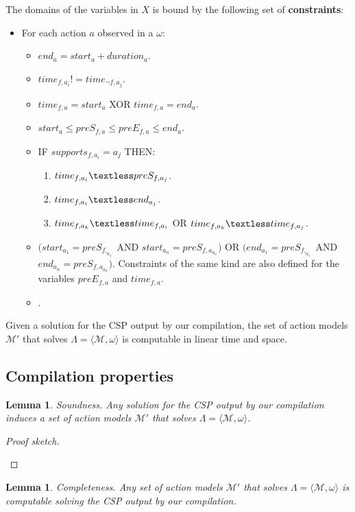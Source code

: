 \documentclass[letterpaper]{article} %
\newcommand{\tup}[1]{{\langle #1 \rangle}}
\newtheorem{lemma}[theorem]{Lemma}
\begin{document}
The domains of the variables in $X$ is bound by the following set of {\bf constraints}:
\begin{itemize}
\item For each action $a$ observed in a $\omega$:
\begin{itemize}
\item $end_a = start_a + duration_a$.
\item $time_{f,a_i}!=time_{\neg f,a_j}$.
\item $time_{f,a}= start_a$ XOR $time_{f,a}= end_a$.
\item $start_a\leq preS_{f,a}\leq preE_{f,a}\leq end_a$.
\item IF $supports_{f,a_i}=a_j$ THEN:
\begin{enumerate}
\item $time_{f,a_i}\textless  preS_{f,a_j}$.
\item $time_{f,a_i}\textless  end_{a_j}$.
\item $time_{f,a_k}\textless time_{f,a_i}$ OR $time_{f,a_k}\textless time_{f,a_j}$.
\end{enumerate}
\item $(start_{a_1} = preS_{f,_{a_1}}$ AND $start_{a_n} = preS_{f,a_{a_n}})$ OR $(end_{a_1} = preS_{f,_{a_1}}$ AND $end_{a_n} = preS_{f,a_{a_n}})$. Constraints of the same kind are also defined for the variables $preE_{f,a}$ and $time_{f,a}$.
\item .
\end{itemize}
\end{itemize}

Given a solution for the CSP output by our compilation, the set of action models $\mathcal{M}'$ that solves $\Lambda=\tup{\mathcal{M},\omega}$ is computable in linear time and space. 


\subsection{Compilation properties}
\begin{lemma}
Soundness. Any solution for the CSP output by our compilation induces a set of action models $\mathcal{M}'$ that solves $\Lambda=\tup{\mathcal{M},\omega}$.
\end{lemma}

\begin{proof}[Proof sketch]
\begin{small}
\end{small}
\end{proof}

\begin{lemma}
Completeness. Any set of action models $\mathcal{M}'$ that solves $\Lambda=\tup{\mathcal{M},\omega}$ is computable solving the CSP output by our compilation.
\end{lemma}
\end{document}
